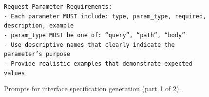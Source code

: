 \begin{figure}[p]
{\begin{minipage}{0.97\textwidth}
        \texttt{Request Parameter Requirements:}\\
        \texttt{- Each parameter MUST include: type, param\_type, required, description, example}\\
        \texttt{- param\_type MUST be one of: ``query'', ``path'', ``body''}\\
        \texttt{- Use descriptive names that clearly indicate the parameter's purpose}\\
        \texttt{- Provide realistic examples that demonstrate expected values}

        \vspace{1pt}
        \end{minipage}
    }
    \captionsetup{labelformat=default, name=Figure}
    \caption{Prompts for interface specification generation (part 1 of 2).}
    \label{fig:gen-api-1}
\end{figure}
